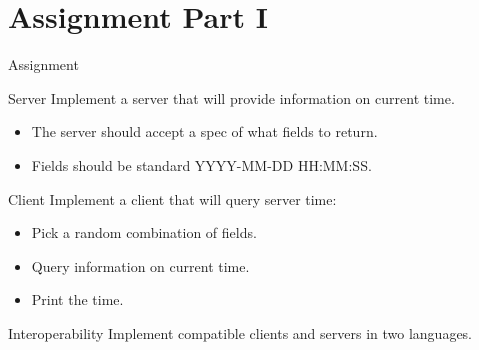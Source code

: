 

\section{Assignment Part I}


\begin{frame}{Assignment}
    \begin{block}{Server}
        Implement a server that will provide information on current time.
        \begin{itemize}
            \item The server should accept a spec of what fields to return.
            \item Fields should be standard YYYY-MM-DD HH:MM:SS.
        \end{itemize}
    \end{block}

    \begin{block}{Client}
        Implement a client that will query server time:
        \begin{itemize}
            \item Pick a random combination of fields.
            \item Query information on current time.
            \item Print the time.
        \end{itemize}
    \end{block}

    \begin{block}{Interoperability}
        Implement compatible clients and servers in two languages.
    \end{block}
\end{frame}


